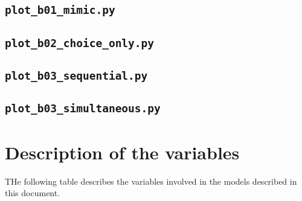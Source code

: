 \documentclass[12pt,a4paper]{article}
\begin{document}


\subsection{\lstinline$plot_b01_mimic.py$}
\label{sec:plot_b01_mimic.py}



\subsection{\lstinline$plot_b02_choice_only.py$}
\label{sec:plot_b02_choice_only.py}



\subsection{\lstinline$plot_b03_sequential.py$}
\label{sec:plot_b03_sequential.py}



\subsection{\lstinline$plot_b03_simultaneous.py$}
\label{sec:plot_b03_simultaneous.py}



\clearpage

\section{Description of the variables}

THe following table describes the variables involved in the models described in this document.
\end{document}
